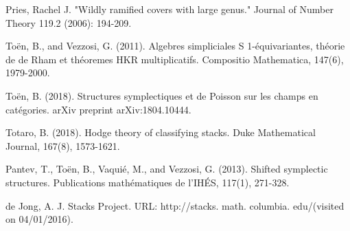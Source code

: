 \documentclass[10pt,a4paper]{amsart}
\numberwithin{equation}{subsection}
\theoremstyle{plain}
\theoremstyle{definition}
\theoremstyle{remark}
\numberwithin{equation}{section}
\begin{document}
\begin{thebibliography}{10}
Pries, Rachel J. "Wildly ramified covers with large genus." Journal of Number Theory 119.2 (2006): 194-209.

To\"en, B., and Vezzosi, G. (2011). Algebres simpliciales S 1-\'equivariantes, théorie de de Rham et th\'eoremes HKR multiplicatifs. Compositio Mathematica, 147(6), 1979-2000.

To\"en, B. (2018). Structures symplectiques et de Poisson sur les champs en cat\'egories. arXiv preprint arXiv:1804.10444.

Totaro, B. (2018). Hodge theory of classifying stacks. Duke Mathematical Journal, 167(8), 1573-1621.

Pantev, T., To\"en, B., Vaqui\'e, M., and Vezzosi, G. (2013). Shifted symplectic structures. Publications math\'ematiques de l'IH\'ES, 117(1), 271-328.

de Jong, A. J. Stacks Project. URL: http://stacks. math. columbia. edu/(visited on 04/01/2016).


\end{thebibliography}
\end{document}
